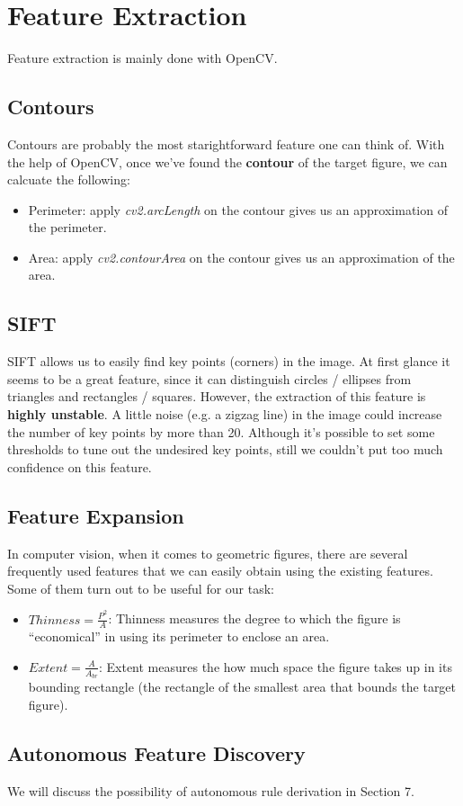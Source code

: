 \section{Feature Extraction}

Feature extraction is mainly done with OpenCV. 

\subsection{Contours}

Contours are probably the most starightforward feature one can think of. With the help of OpenCV, once we've found the \textbf{contour} of the target figure, we can calcuate the following:

\begin{itemize}
\item Perimeter: apply \textit{cv2.arcLength} on the contour gives us an approximation of the perimeter.
\item Area: apply \textit{cv2.contourArea} on the contour gives us an approximation of the area.
\end{itemize}

\subsection{SIFT}

SIFT allows us to easily find key points (corners) in the image. At first glance it seems to be a great feature, since it can distinguish circles / ellipses from triangles and rectangles / squares. However, the extraction of this feature is \textbf{highly unstable}. A little noise (e.g. a zigzag line) in the image could increase the number of key points by more than 20. Although it's possible to set some thresholds to tune out the undesired key points, still we couldn't put too much confidence on this feature.

\subsection{Feature Expansion}

In computer vision, when it comes to geometric figures, there are several frequently used features that we can easily obtain using the existing features. Some of them turn out to be useful for our task:

\begin{itemize}
\item $Thinness = \frac{P^2}{A}$: Thinness measures the degree to which the figure is ``economical'' in using its perimeter to enclose an area. 
\item $Extent = \frac{A}{A_{br}}$: Extent measures the how much space the figure takes up in its bounding rectangle (the rectangle of the smallest area that bounds the target figure).
\end{itemize}

\subsection{Autonomous Feature Discovery}

We will discuss the possibility of autonomous rule derivation in Section 7.
